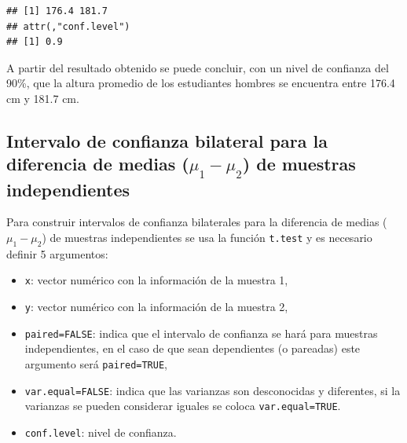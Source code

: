 \documentclass[10pt,]{krantz}
\makeatletter
\newenvironment{Shaded}{\begin{snugshade}}{\end{snugshade}}
\newcommand{\KeywordTok}[1]{\textcolor[rgb]{0.13,0.29,0.53}{\textbf{#1}}}
\newcommand{\DataTypeTok}[1]{\textcolor[rgb]{0.13,0.29,0.53}{#1}}
\newcommand{\FloatTok}[1]{\textcolor[rgb]{0.00,0.00,0.81}{#1}}
\newcommand{\OperatorTok}[1]{\textcolor[rgb]{0.81,0.36,0.00}{\textbf{#1}}}
\newcommand{\NormalTok}[1]{#1}
\providecommand{\tightlist}{%
  \setlength{\itemsep}{0pt}\setlength{\parskip}{0pt}}
\newenvironment{kframe}{%
\medskip{}
\setlength{\fboxsep}{.8em}
 \def\at@end@of@kframe{}%
 \ifinner\ifhmode%
  \def\at@end@of@kframe{\end{minipage}}%
  \begin{minipage}{\columnwidth}%
 \fi\fi%
 \def\FrameCommand##1{\hskip\@totalleftmargin \hskip-\fboxsep
 \colorbox{shadecolor}{##1}\hskip-\fboxsep
     \hskip-\linewidth \hskip-\@totalleftmargin \hskip\columnwidth}%
 \MakeFramed {\advance\hsize-\width
   \@totalleftmargin\z@ \linewidth\hsize
   \@setminipage}}%
 {\par\unskip\endMakeFramed%
 \at@end@of@kframe}
\renewenvironment{Shaded}{\begin{kframe}}{\end{kframe}}
\makeatother
\begin{document}
\begin{Shaded}
\end{Shaded}

\begin{verbatim}
## [1] 176.4 181.7
## attr(,"conf.level")
## [1] 0.9
\end{verbatim}

A partir del resultado obtenido se puede concluir, con un nivel de
confianza del 90\%, que la altura promedio de los estudiantes hombres se
encuentra entre 176.4 cm y 181.7 cm.

\subsection{\texorpdfstring{Intervalo de confianza bilateral para la
diferencia de medias (\(\mu_1-\mu_2\)) de muestras
independientes}{Intervalo de confianza bilateral para la diferencia de medias (\textbackslash{}mu\_1-\textbackslash{}mu\_2) de muestras independientes}}\label{intervalo-de-confianza-bilateral-para-la-diferencia-de-medias-mu_1-mu_2-de-muestras-independientes}

Para construir intervalos de confianza bilaterales para la diferencia de
medias (\(\mu_1-\mu_2\)) de muestras independientes se usa la función
\texttt{t.test} y es necesario definir 5 argumentos:

\begin{itemize}
\tightlist
\item
  \texttt{x}: vector numérico con la información de la muestra 1,
\item
  \texttt{y}: vector numérico con la información de la muestra 2,
\item
  \texttt{paired=FALSE}: indica que el intervalo de confianza se hará
  para muestras independientes, en el caso de que sean dependientes (o
  pareadas) este argumento será \texttt{paired=TRUE},
\item
  \texttt{var.equal=FALSE}: indica que las varianzas son desconocidas y
  diferentes, si la varianzas se pueden considerar iguales se coloca
  \texttt{var.equal=TRUE}.
\item
  \texttt{conf.level}: nivel de confianza.
\end{itemize}
\end{document}
